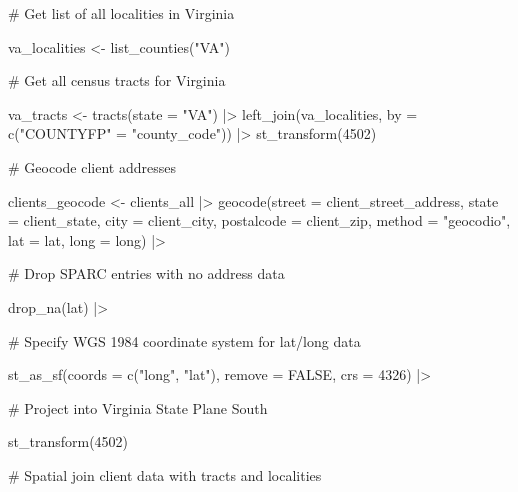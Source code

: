\documentclass[
  letterpaper,
  DIV=11,
  numbers=noendperiod]{scrartcl}
\newenvironment{Shaded}{\begin{snugshade}}{\end{snugshade}}
\newcommand{\AttributeTok}[1]{\textcolor[rgb]{0.40,0.45,0.13}{#1}}
\newcommand{\CommentTok}[1]{\textcolor[rgb]{0.37,0.37,0.37}{#1}}
\newcommand{\ConstantTok}[1]{\textcolor[rgb]{0.56,0.35,0.01}{#1}}
\newcommand{\DecValTok}[1]{\textcolor[rgb]{0.68,0.00,0.00}{#1}}
\newcommand{\FunctionTok}[1]{\textcolor[rgb]{0.28,0.35,0.67}{#1}}
\newcommand{\NormalTok}[1]{\textcolor[rgb]{0.00,0.23,0.31}{#1}}
\newcommand{\OtherTok}[1]{\textcolor[rgb]{0.00,0.23,0.31}{#1}}
\newcommand{\SpecialCharTok}[1]{\textcolor[rgb]{0.37,0.37,0.37}{#1}}
\newcommand{\StringTok}[1]{\textcolor[rgb]{0.13,0.47,0.30}{#1}}
\begin{document}
\begin{Shaded}
\begin{Highlighting}[]
\CommentTok{\# Get list of all localities in Virginia}

\NormalTok{va\_localities }\OtherTok{\textless{}{-}} \FunctionTok{list\_counties}\NormalTok{(}\StringTok{"VA"}\NormalTok{)}

\CommentTok{\# Get all census tracts for Virginia}

\NormalTok{va\_tracts }\OtherTok{\textless{}{-}} \FunctionTok{tracts}\NormalTok{(}\AttributeTok{state =} \StringTok{"VA"}\NormalTok{) }\SpecialCharTok{|\textgreater{}} 
  \FunctionTok{left\_join}\NormalTok{(va\_localities, }\AttributeTok{by =} \FunctionTok{c}\NormalTok{(}\StringTok{"COUNTYFP"} \OtherTok{=} \StringTok{"county\_code"}\NormalTok{)) }\SpecialCharTok{|\textgreater{}} 
  \FunctionTok{st\_transform}\NormalTok{(}\DecValTok{4502}\NormalTok{)}

\CommentTok{\# Geocode client addresses}

\NormalTok{clients\_geocode }\OtherTok{\textless{}{-}}\NormalTok{ clients\_all }\SpecialCharTok{|\textgreater{}} 
  \FunctionTok{geocode}\NormalTok{(}\AttributeTok{street =}\NormalTok{ client\_street\_address, }\AttributeTok{state =}\NormalTok{ client\_state,}
          \AttributeTok{city =}\NormalTok{ client\_city, }\AttributeTok{postalcode =}\NormalTok{ client\_zip,}
          \AttributeTok{method =} \StringTok{"geocodio"}\NormalTok{,}
          \AttributeTok{lat =}\NormalTok{ lat,}
          \AttributeTok{long =}\NormalTok{ long) }\SpecialCharTok{|\textgreater{}} 
  
  \CommentTok{\# Drop SPARC entries with no address data}
  
  \FunctionTok{drop\_na}\NormalTok{(lat) }\SpecialCharTok{|\textgreater{}} 
  
  \CommentTok{\# Specify WGS 1984 coordinate system for lat/long data}
  
  \FunctionTok{st\_as\_sf}\NormalTok{(}\AttributeTok{coords =} \FunctionTok{c}\NormalTok{(}\StringTok{"long"}\NormalTok{, }\StringTok{"lat"}\NormalTok{),}
           \AttributeTok{remove =} \ConstantTok{FALSE}\NormalTok{,}
           \AttributeTok{crs =} \DecValTok{4326}\NormalTok{) }\SpecialCharTok{|\textgreater{}} 
  
  \CommentTok{\# Project into Virginia State Plane South}
  
  \FunctionTok{st\_transform}\NormalTok{(}\DecValTok{4502}\NormalTok{)}

\CommentTok{\# Spatial join client data with tracts and localities}
  

\end{Highlighting}
\end{Shaded}
\end{document}
